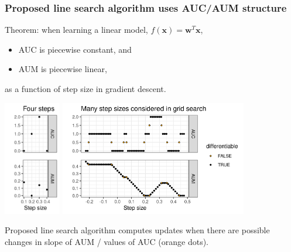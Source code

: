 \documentclass[t]{beamer}
\begin{document}
\begin{frame}
  \frametitle{Proposed line search algorithm uses AUC/AUM structure}

  Theorem: when learning a linear model, $f(\mathbf x)= \mathbf w^T \mathbf x$,
  \begin{itemize}
  \item AUC is piecewise constant, and
  \item AUM is piecewise linear,
  \end{itemize}
  as a function of step size in gradient descent.
  
\includegraphics[height=5cm]{figure-line-search-example-some}
\includegraphics[height=5cm]{figure-line-search-example-grid}
 
Proposed line search algorithm computes updates when there are
possible changes in slope of AUM / values of AUC (orange dots).

\end{frame}


\end{document}
